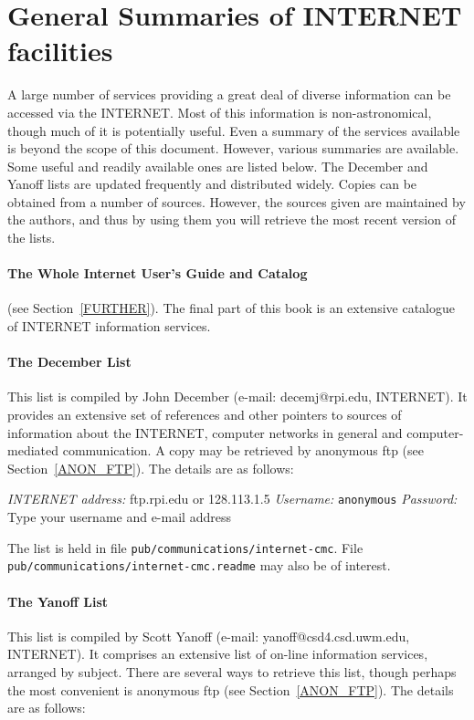 \documentclass[twoside,11pt,nolof]{starlink}
\begin{document}
\section{General Summaries of INTERNET facilities
}

A large number of services providing a great deal of diverse information
can be accessed via the INTERNET. Most of this information is
non-astronomical, though much of it is potentially useful. Even a
summary of the services available is beyond the scope of this
document. However, various summaries are available. Some useful and
readily available ones are listed below. The December and Yanoff lists
are updated frequently and distributed widely. Copies can be obtained
from a number of sources. However, the sources given are maintained
by the authors, and thus by using them you will retrieve the most recent
version of the lists.

\paragraph{The Whole Internet User's Guide and Catalog} (see
Section~\ref{FURTHER}). The final part of this book is an extensive
catalogue of INTERNET information services.

\paragraph{The December List} This list is compiled by John December
(e-mail: decemj@rpi.edu,
\newline INTERNET). It provides an extensive set of
references and other pointers to sources of information about the
INTERNET, computer networks in general and computer-mediated
communication. A copy may be retrieved by anonymous ftp (see
Section~\ref{ANON_FTP}). The details are as follows:

\textit{INTERNET address: } ftp.rpi.edu or 128.113.1.5
\newline \textit{Username:} \verb-anonymous-
\newline \textit{Password:} Type your username and e-mail address

The list is held in file \texttt{pub/communications/internet-cmc}.
\newline File \texttt{pub/communications/internet-cmc.readme} may also be
of interest.

\paragraph{The Yanoff List} This list is compiled by Scott Yanoff
(e-mail: yanoff@csd4.csd.uwm.edu, INTERNET). It comprises an extensive
list of on-line information services, arranged by subject. There are
several ways to retrieve this list, though perhaps the most convenient
is anonymous ftp (see Section~\ref{ANON_FTP}). The details are as
follows:
\end{document}
